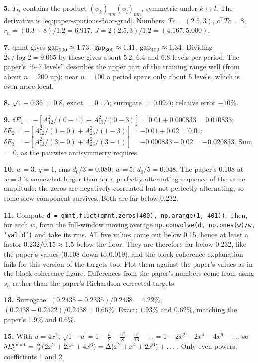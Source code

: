 \textbf{5.} $T_{kl}$ contains the product $(\phi_k)_{nm}(\phi_l)_{nm}$, symmetric under $k\leftrightarrow l$. The derivative is \cref{eq:paper-spurious-floor-grad}. Numbers: $Tc=(2.5,3)$, $c^\top Tc=8$, $r_n=(0.3+8)/1.2=6.917$, $J=2(2.5,3)/1.2=(4.167,5.000)$.

\textbf{7.} qmnt gives $\mathrm{gap}_{100}\approx1.73$, $\mathrm{gap}_{300}\approx1.41$, $\mathrm{gap}_{400}\approx1.34$. Dividing $2\pi/\log2=9.065$ by these gives about 5.2, 6.4 and 6.8 levels per period. The paper's ``6--7 levels'' describes the upper part of the training range well (from about $n=200$ up); near $n=100$ a period spans only about 5 levels, which is even more local.

\textbf{8.} $\sqrt{1-0.36}=0.8$, exact $=0.1\Delta$; surrogate $=0.09\Delta$; relative error $-10\%$.

\textbf{9.} $\delta E_1=-[A_{12}^2/(0-1)+A_{13}^2/(0-3)]=0.01+0.000833=0.010833$; $\delta E_2=-[A_{12}^2/(1-0)+A_{23}^2/(1-3)]=-0.01+0.02=0.01$; $\delta E_3=-[A_{13}^2/(3-0)+A_{23}^2/(3-1)]=-0.000833-0.02=-0.020833$. Sum $=0$, as the pairwise antisymmetry requires.

\textbf{10.} $w=3$: $q=1$, rms $d_0/3=0.080$; $w=5$: $d_0/5=0.048$. The paper's 0.108 at $w=3$ is somewhat larger than for a perfectly alternating sequence of the same amplitude: the zeros are negatively correlated but not perfectly alternating, so some slow component survives. Both are far below 0.232.

\textbf{11.} Compute \texttt{d = qmnt.fluct(qmnt.zeros(400), np.arange(1, 401))}. Then, for each $w$, form the full-window moving average \texttt{np.convolve(d, np.ones(w)/w, 'valid')} and take its rms. All five values come out below 0.15, hence at least a factor $0.232/0.15\approx1.5$ below the floor. They are therefore far below 0.232, like the paper's values (0.108 down to 0.019), and the block-coherence explanation fails for this version of the targets too. Plot them against the paper's values as in the block-coherence figure. Differences from the paper's numbers come from using $s_n$ rather than the paper's Richardson-corrected targets.

\textbf{13.} Surrogate: $(0.2438-0.2335)/0.2438=4.22\%$, $(0.2438-0.2422)/0.2438=0.66\%$. Exact: $1.93\%$ and $0.62\%$, matching the paper's 1.9\% and 0.6\%.

\textbf{15.} With $u=4x^2$, $\sqrt{1-u}=1-\tfrac u2-\tfrac{u^2}8-\tfrac{u^3}{16}-\dots=1-2x^2-2x^4-4x^6-\dots$, so $\delta E_1^{\rm exact}=\tfrac\Delta2(2x^2+2x^4+4x^6)=\Delta(x^2+x^4+2x^6)+\dots$. Only even powers; coefficients 1 and 2.

